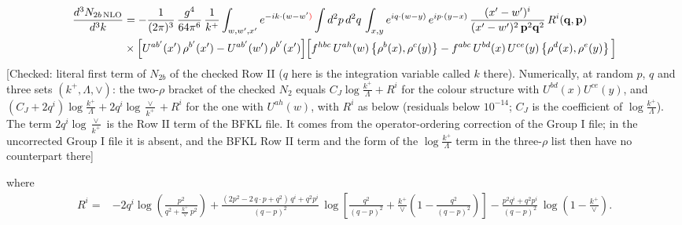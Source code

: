 \documentclass[9pt]{article}
\numberwithin{equation}{section}
\begin{document}
\begin{align}
\frac{d^{3}N_{2b\,\rm NLO}}{d^{3}k} & = -\frac{1}{(2\pi)^{3}}\,\frac{g^{4}}{64\pi^{6}}\,\frac{1}{k^{+}}\int_{w,w',x'} e^{-ik\cdot(w-w'{\color{red})}}
\int d^{2}p\,d^{2}q\,\int_{x,y} e^{iq\cdot(w-y)}\,e^{ip\cdot(y-x)}\,\frac{(x'-w')^{i}}{(x'-w')^{2}\,\mathbf{p}^{2}\mathbf{q}^{2}}\,R^{i}(\mathbf{q},\mathbf{p})\notag\\
&\times\Big[U^{ab'}(x')\,\rho^{b'}(x')-U^{ab'}(w')\,\rho^{b'}(x')\Big]
\Big[f^{hbc}\,U^{ah}(w)\left\{\rho^{b}(x),\rho^{c}(y)\right\}-f^{abc}\,U^{bd}(x)\,U^{ce}(y)\left\{\rho^{d}(x),\rho^{e}(y)\right\}\Big]
\end{align} {\color{red}[Checked: literal first term of $N_{2b}$ of the checked Row II ($q$ here is the integration variable called $k$ there). Numerically, at random $p$, $q$ and three sets $(k^{+},\Lambda,\vee)$: the two-$\rho$ bracket of the checked $N_{2}$ equals $C_{J}\log\frac{k^{+}}{\Lambda}+R^{i}$ for the colour structure with $U^{bd}(x)U^{ce}(y)$, and $(C_{J}+2q^{i})\log\frac{k^{+}}{\Lambda}+2q^{i}\log\frac{\vee}{k^{+}}+R^{i}$ for the one with $U^{ah}(w)$, with $R^{i}$ as below (residuals below $10^{-14}$; $C_{J}$ is the coefficient of $\log\frac{k^{+}}{\Lambda}$). The term $2q^{i}\log\frac{\vee}{k^{+}}$ is the Row II term of the BFKL file. It comes from the operator-ordering correction of the Group I file; in the uncorrected Group I file it is absent, and the BFKL Row II term and the form of the $\log\frac{k^{+}}{\Lambda}$ term in the three-$\rho$ list then have no counterpart there]}\par\noindent
where
\begin{align}
R^{i} =& -2q^{i}\log\left(\frac{p^{2}}{q^{2}+\frac{k^{+}}{\vee}\,p^{2}}\right)
+\frac{(2p^{2}-2\,q\cdot p+q^{2})\,q^{i}+q^{2}p^{i}}{(q-p)^{2}}\,
\log\left[\frac{q^{2}}{(q-p)^{2}}+\frac{k^{+}}{\vee}\left(1-\frac{q^{2}}{(q-p)^{2}}\right)\right]
-\frac{p^{2}q^{i}+q^{2}p^{i}}{(q-p)^{2}}\,\log\left(1-\frac{k^{+}}{\vee}\right).
\end{align}
\end{document}
